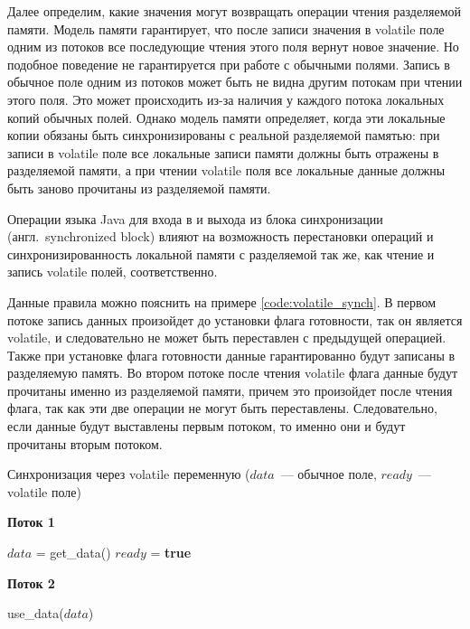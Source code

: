 \documentclass[14pt,titlepage]{extarticle}
\newcommand{\algorithmictitle}[1]{\hspace{8mm}\textbf{#1}}
\newcommand{\BOOLTRUE}{\textbf{true }}
\newcommand{\eng}[1]{{\English#1}}
\newcommand{\engdef}[1]{(англ.~\eng{#1})}
\newcommand{\java}{\eng{Java}\xspace}
\begin{document}
      Далее определим, какие значения могут возвращать операции чтения
      разделяемой памяти. Модель памяти гарантирует, что после записи значения
      в \eng{volatile} поле одним из потоков все последующие чтения этого поля
      вернут новое значение. Но подобное поведение не гарантируется при работе
      с обычными полями. Запись в обычное поле одним из потоков может быть не
      видна другим потокам при чтении этого поля. Это может происходить из-за
      наличия у каждого потока локальных копий обычных полей.  Однако модель
      памяти определяет, когда эти локальные копии обязаны быть
      синхронизированы с реальной разделяемой памятью: при записи в
      \eng{volatile} поле все локальные записи памяти должны быть отражены в
      разделяемой памяти, а при чтении \eng{volatile} поля все локальные данные
      должны быть заново прочитаны из разделяемой памяти.

      Операции языка \java для входа в и выхода из блока синхронизации
      \engdef{synchronized block} влияют на возможность перестановки операций и
      синхронизированность локальной памяти с разделяемой так же, как чтение и
      запись \eng{volatile} полей, соответственно.

      Данные правила можно пояснить на примере \ref{code:volatile_synch}.
      В первом потоке запись данных произойдет до установки флага готовности,
      так он является \eng{volatile}, и следовательно не может быть переставлен
      с предыдущей операцией. Также при установке флага готовности данные
      гарантированно будут записаны в разделяемую память.
      Во втором потоке после чтения \eng{volatile} флага данные будут прочитаны
      именно из разделяемой памяти, причем это произойдет после чтения флага,
      так как эти две операции не могут быть переставлены.
      Следовательно, если данные будут выставлены первым потоком, то именно
      они и будут прочитаны вторым потоком.
      \begin{algorithm}
        \caption{Синхронизация через \eng{volatile} переменную
          ($data$~--- обычное поле, $ready$~--- \eng{volatile} поле)}
        \label{code:volatile_synch}
        \begin{multicols}{2}
          \algorithmictitle{Поток 1}
          \begin{algorithmic}[1]
            \STATE $data$ = get\_data()
            \STATE $ready$ = \BOOLTRUE
          \end{algorithmic}
          \columnbreak
          \algorithmictitle{Поток 2}
          \begin{algorithmic}[1]
            \STATE {}
            \ENDWHILE
            \STATE use\_data($data$)
          \end{algorithmic}
        \end{multicols}
      \end{algorithm}
\end{document}
